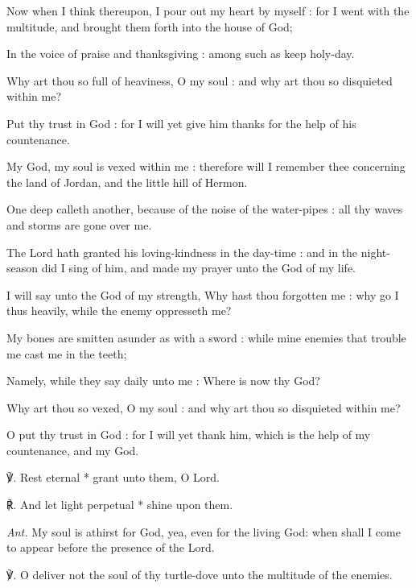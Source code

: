 Now when I think thereupon, I pour out my heart by myself : for I went with the multitude, and brought them forth into the house of God;\par
{}In the voice of praise and thanksgiving : among such as keep holy-day.\par
{}Why art thou so full of heaviness, O my soul : and why art thou so disquieted within me?\par
{}Put thy trust in God : for I will yet give him thanks for the help of his countenance.\par
{}My God, my soul is vexed within me : therefore will I remember thee concerning the land of Jordan, and the little hill of Hermon.\par
{}One deep calleth another, because of the noise of the water-pipes : all thy waves and storms are gone over me.\par
{}The Lord hath granted his loving-kindness in the day-time : and in the night-season did I sing of him, and made my prayer unto the God of my life.\par
{}I will say unto the God of my strength, Why hast thou forgotten me : why go I thus heavily, while the enemy oppresseth me?\par
{}My bones are smitten asunder as with a sword : while mine enemies that trouble me cast me in the teeth;\par
{}Namely, while they say daily unto me : Where is now thy God?\par
{}Why art thou so vexed, O my soul : and why art thou so disquieted within me?\par
{}O put thy trust in God : for I will yet thank him, which is the help of my countenance, and my God.\par
℣. Rest eternal * grant unto them, O Lord.\par
℟. And let light perpetual * shine upon them.\par\noindent
\textit{Ant.} My soul is athirst for God, yea, even for the living God: when shall I come to appear before the presence of the Lord.\par
\vspace{0.5\baselineskip}
℣. O deliver not the soul of thy turtle-dove unto the multitude of the enemies.\par
